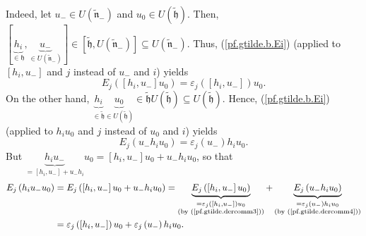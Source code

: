 \documentclass[etingof-lie.tex]{subfiles}
\begin{document}
\begin{verlong}
Indeed, let $u_{-}\in U\left(  \widetilde{\mathfrak{n}}_{-}\right)  $ and
$u_{0}\in U\left(  \widetilde{\mathfrak{h}}\right)  $. Then, $\left[
\underbrace{h_{i}}_{\in\mathfrak{h}},\underbrace{u_{-}}_{\in U\left(
\widetilde{\mathfrak{n}}_{-}\right)  }\right]  \in\left[
\widetilde{\mathfrak{h}},U\left(  \widetilde{\mathfrak{n}}_{-}\right)
\right]  \subseteq U\left(  \widetilde{\mathfrak{n}}_{-}\right)  $. Thus,
(\ref{pf.gtilde.b.Ei}) (applied to $\left[  h_{i},u_{-}\right]  $ and $j$
instead of $u_{-}$ and $i$) yields%
\begin{equation}
E_{j}\left(  \left[  h_{i},u_{-}\right]  u_{0}\right)  =\varepsilon_{j}\left(
\left[  h_{i},u_{-}\right]  \right)  u_{0}. \label{pf.gtilde.dercomm3}%
\end{equation}
On the other hand, $\underbrace{h_{i}}_{\in\widetilde{\mathfrak{h}}%
}\underbrace{u_{0}}_{\in U\left(  \widetilde{\mathfrak{h}}\right)  }%
\in\widetilde{\mathfrak{h}}U\left(  \widetilde{\mathfrak{h}}\right)  \subseteq
U\left(  \widetilde{\mathfrak{h}}\right)  $. Hence, (\ref{pf.gtilde.b.Ei})
(applied to $h_{i}u_{0}$ and $j$ instead of $u_{0}$ and $i$) yields%
\begin{equation}
E_{j}\left(  u_{-}h_{i}u_{0}\right)  =\varepsilon_{j}\left(  u_{-}\right)
h_{i}u_{0}. \label{pf.gtilde.dercomm4}%
\end{equation}
But $\underbrace{h_{i}u_{-}}_{=\left[  h_{i},u_{-}\right]  +u_{-}h_{i}}%
u_{0}=\left[  h_{i},u_{-}\right]  u_{0}+u_{-}h_{i}u_{0}$, so that
\begin{align}
E_{j}\left(  h_{i}u_{-}u_{0}\right)   &  =E_{j}\left(  \left[  h_{i}%
,u_{-}\right]  u_{0}+u_{-}h_{i}u_{0}\right)  =\underbrace{E_{j}\left(  \left[
h_{i},u_{-}\right]  u_{0}\right)  }_{\substack{=\varepsilon_{j}\left(  \left[
h_{i},u_{-}\right]  \right)  u_{0}\\\text{(by (\ref{pf.gtilde.dercomm3}))}%
}}+\underbrace{E_{j}\left(  u_{-}h_{i}u_{0}\right)  }_{\substack{=\varepsilon
_{j}\left(  u_{-}\right)  h_{i}u_{0}\\\text{(by (\ref{pf.gtilde.dercomm4}))}%
}}\nonumber\\
&  =\varepsilon_{j}\left(  \left[  h_{i},u_{-}\right]  \right)  u_{0}%
+\varepsilon_{j}\left(  u_{-}\right)  h_{i}u_{0}. \label{pf.gtilde.dercomm5}%
\end{align}



\end{verlong}
\end{document}
